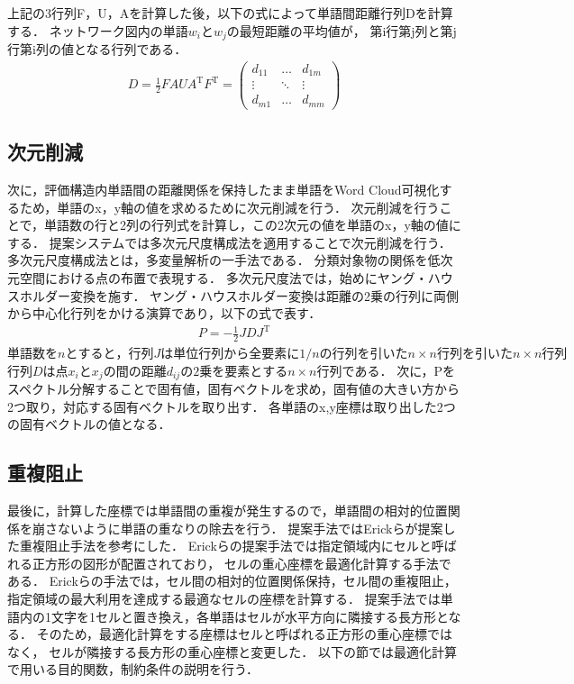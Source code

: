 \documentclass[syuuron]{kuee}
\begin{document}
				
				
			上記の3行列F，U，Aを計算した後，以下の式によって単語間距離行列Dを計算する．
			$ネットワーク図内の単語w_iとw_jの最短距離の平均値が，$
			第i行第j列と第j行第i列の値となる行列である．
			\begin{eqnarray}
			 D = \frac{1}{2} FAUA^{\mathrm{T}}F^{\mathrm{T}}
			   = \left(
			    \begin{array}{cccc}
			    	d_{11} & \ldots & d_{1m} \\
			    	\vdots & \ddots & \vdots \\
			    	d_{m1} & \ldots & d_{mm}
				\end{array}
			 \right)
			\end{eqnarray}	
			
		\subsection{次元削減}
			次に，評価構造内単語間の距離関係を保持したまま単語をWord Cloud可視化するため，単語のx，y軸の値を求めるために次元削減を行う．
			次元削減を行うことで，単語数の行と2列の行列式を計算し，この2次元の値を単語のx，y軸の値にする．
			提案システムでは多次元尺度構成法を適用することで次元削減を行う．
			多次元尺度構成法とは，多変量解析の一手法である． 分類対象物の関係を低次元空間における点の布置で表現する．
			多次元尺度法では，始めにヤング・ハウスホルダー変換を施す．
			ヤング・ハウスホルダー変換は距離の2乗の行列に両側から中心化行列をかける演算であり，以下の式で表す．
			\begin{eqnarray}
				P = - \frac{1}{2} JDJ^{\mathrm{T}}
			\end{eqnarray}
			$単語数をnとすると，行列Jは単位行列から全要素に1/nの行列を引いたn \times n行列を引いたn \times n行列$
			$行列Dは点 x_i と x_j の間の距離 d_{ij} の2乗を要素とするn×n行列である．$
			次に，Pをスペクトル分解することで固有値，固有ベクトルを求め，固有値の大きい方から2つ取り，対応する固有ベクトルを取り出す．
			各単語のx,y座標は取り出した2つの固有ベクトルの値となる．
			
		\subsection{重複阻止}
			最後に，計算した座標では単語間の重複が発生するので，単語間の相対的位置関係を崩さないように単語の重なりの除去を行う．
			提案手法ではErickらが提案した重複阻止手法を参考にした\cite{or2}．
			Erickらの提案手法では指定領域内にセルと呼ばれる正方形の図形が配置されており，
			セルの重心座標を最適化計算する手法である．
			Erickらの手法では，セル間の相対的位置関係保持，セル間の重複阻止，指定領域の最大利用を達成する最適なセルの座標を計算する．
			提案手法では単語内の1文字を1セルと置き換え，各単語はセルが水平方向に隣接する長方形となる．
			そのため，最適化計算をする座標はセルと呼ばれる正方形の重心座標ではなく，
			セルが隣接する長方形の重心座標と変更した．
			以下の節では最適化計算で用いる目的関数，制約条件の説明を行う．
			
\end{document}
